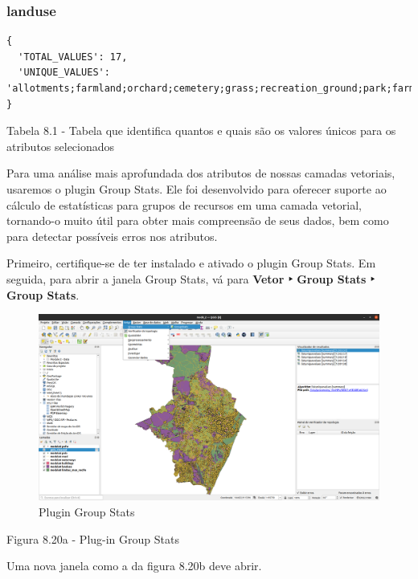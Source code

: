\documentclass[
]{book}
\begin{document}
\hypertarget{landuse}{%
\subsubsection{landuse}\label{landuse}}

\begin{verbatim}
{
  'TOTAL_VALUES': 17,
  'UNIQUE_VALUES': 'allotments;farmland;orchard;cemetery;grass;recreation_ground;park;farmyard;industrial;meadow;heath;commercial;forest;scrub;retail;military;residential'
}
\end{verbatim}

Tabela 8.1 - Tabela que identifica quantos e quais são os valores únicos para os atributos selecionados

Para uma análise mais aprofundada dos atributos de nossas camadas vetoriais, usaremos o plugin Group Stats. Ele foi desenvolvido para oferecer suporte ao cálculo de estatísticas para grupos de recursos em uma camada vetorial, tornando-o muito útil para obter mais compreensão de seus dados, bem como para detectar possíveis erros nos atributos.

Primeiro, certifique-se de ter instalado e ativado o plugin Group Stats. Em seguida, para abrir a janela Group Stats, vá para \textbf{Vetor ‣ Group Stats ‣ Group Stats}.

\begin{figure}
\centering
\includegraphics{media/modulo8/fig820_a.png}
\caption{Plugin Group Stats}
\end{figure}

Figura 8.20a - Plug-in Group Stats

Uma nova janela como a da figura 8.20b deve abrir.
\end{document}
